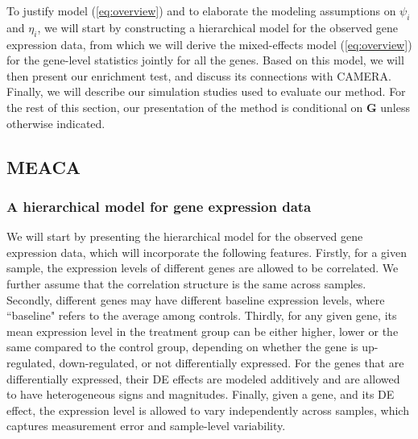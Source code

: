 \documentclass[a4,center,fleqn]{NAR}
\newcommand{\OurMethod}{MEACA}
\newcommand{\DED}{differentially expressed}
\begin{document}
	To justify model (\ref{eq:overview}) and to elaborate the modeling 
	assumptions on $\psi_i$ 
	and $\eta_i$, we will start by constructing a hierarchical model for the observed gene 
	expression data, from which we will derive the mixed-effects model (\ref{eq:overview}) for the 
	gene-level statistics jointly for all the genes. Based on this model, we will then present our 
	enrichment test, and 
	discuss its connections with CAMERA. Finally, we will describe our simulation studies used to 
	evaluate our method. For the rest of this section, our presentation of the method is 
	conditional on $\bm G$ unless otherwise indicated.
	
	\subsection{\OurMethod}
	\subsubsection{A hierarchical model for gene expression data}\label{subsection:YModel}
	We will start by presenting the hierarchical model for the observed gene expression data, which
	will incorporate the following features. Firstly, for a given sample, the expression levels of 
	different genes are allowed to be correlated. We further assume that the correlation structure 
	is the same across samples. Secondly, different genes may have different baseline expression 
	levels, where ``baseline" refers to the	average among controls. Thirdly, for any given gene, 
	its mean expression level in the treatment group can be either higher, lower or the same 
	compared to the control group, depending on whether the gene is up-regulated, down-regulated, 
	or not \DED. For the genes that are \DED, their DE effects are modeled 
	additively and are allowed to have heterogeneous signs and magnitudes. Finally, given a gene, 
	and its DE effect, the expression level is allowed to vary independently across samples, which 
	captures measurement error and sample-level variability.
	
\end{document}
